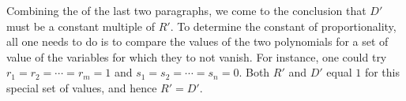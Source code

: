\documentclass[12pt]{article}
\begin{document}
Combining the  of the last two paragraphs, we come to the conclusion that $D'$ must be a constant multiple of $R'$.  To determine the constant of proportionality, all one needs to do is to compare the values of the two polynomials for a set of value of the variables for which they to not vanish.  For instance, one could try $r_1 = r_2 = \cdots = r_m = 1$ and $s_1 = s_2 = \cdots = s_n = 0$.  Both $R'$ and $D'$ equal $1$ for this special set of values, and hence $R' = D'$.
\end{document}
